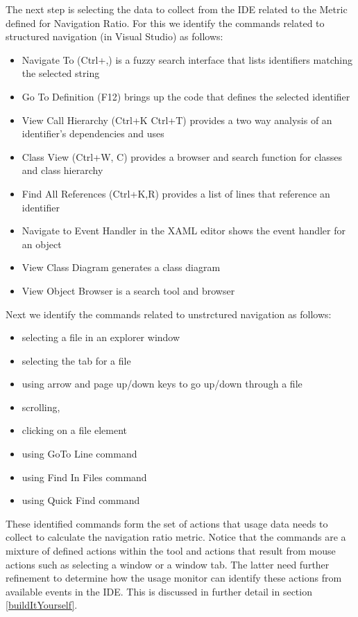 The next step is selecting the data to collect from the IDE related to the Metric defined for Navigation Ratio.  For this we identify the  commands related to structured navigation (in Visual Studio) as follows:
\begin{itemize}
\item 
 Navigate To (Ctrl+,) is a fuzzy search interface that lists identifiers matching the selected string 
\item Go To Definition (F12) brings up the code that defines the selected identifier 
\item View Call Hierarchy (Ctrl+K Ctrl+T) provides a two way analysis of an identifier's dependencies and uses
\item Class View (Ctrl+W, C) provides a browser and search function for classes and class hierarchy
\item Find All References (Ctrl+K,R) provides a list of lines that reference an identifier
\item Navigate to Event Handler in the XAML editor shows the event handler for an object
\item View Class Diagram generates a class diagram 
\item View Object Browser is a search tool and browser
\end{itemize}

Next we identify the commands related to unstrctured navigation as follows:
\begin{itemize}
\item selecting a file in an explorer window
\item selecting the tab for a file
\item using arrow and page up/down keys to go up/down through a file
\item scrolling, 
\item clicking on a file element
\item using GoTo Line command
\item using Find In Files command
\item using Quick Find command
\end{itemize}

These identified commands form the set of actions that usage data needs to collect to calculate the navigation ratio metric.  Notice that the commands are a mixture of defined actions within the tool and actions that result from mouse actions such as selecting a window or a window tab.  The latter need further refinement to determine how the usage monitor can identify these actions from available events in the IDE.  This is discussed in further detail in section \ref{buildItYourself}.

